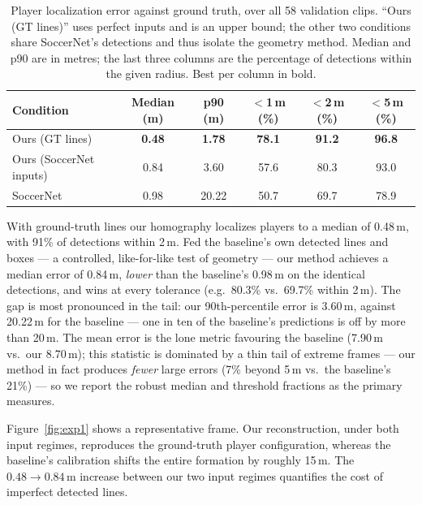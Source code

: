 \documentclass{article}
\begin{document}
\begin{table}[t]
  \caption{Player localization error against ground truth, over all 58
    validation clips. ``Ours (GT lines)'' uses perfect inputs and is an upper
    bound; the other two conditions share SoccerNet's detections and thus
    isolate the geometry method. Median and p90 are in metres; the last three
    columns are the percentage of detections within the given radius. Best
    per column in bold.}
  \label{tab:exp1}
  \centering
  \begin{tabular}{lccccc}
    \toprule
    Condition & Median (m) & p90 (m) & $<$1\,m (\%) & $<$2\,m (\%) & $<$5\,m (\%) \\
    \midrule
    Ours (GT lines)         & \textbf{0.48} & \textbf{1.78}  & \textbf{78.1} & \textbf{91.2} & \textbf{96.8} \\
    Ours (SoccerNet inputs) & 0.84          & 3.60           & 57.6          & 80.3          & 93.0 \\
    SoccerNet               & 0.98          & 20.22          & 50.7          & 69.7          & 78.9 \\
    \bottomrule
  \end{tabular}
\end{table}

With ground-truth lines our homography localizes players to a median of
0.48\,m, with 91\% of detections within 2\,m. Fed the baseline's own detected
lines and boxes --- a controlled, like-for-like test of geometry --- our
method achieves a median error of 0.84\,m, \emph{lower} than the baseline's
0.98\,m on the identical detections, and wins at every tolerance (e.g.\ 80.3\%
vs.\ 69.7\% within 2\,m). The gap is most pronounced in the tail: our
90th-percentile error is 3.60\,m, against 20.22\,m for the baseline --- one in
ten of the baseline's predictions is off by more than 20\,m. The mean error is
the lone metric favouring the baseline (7.90\,m vs.\ our 8.70\,m); this
statistic is dominated by a thin tail of extreme frames --- our method in fact
produces \emph{fewer} large errors (7\% beyond 5\,m vs.\ the baseline's 21\%)
--- so we report the robust median and threshold fractions as the primary
measures.

Figure~\ref{fig:exp1} shows a representative frame. Our reconstruction, under
both input regimes, reproduces the ground-truth player configuration, whereas
the baseline's calibration shifts the entire formation by roughly 15\,m. The
$0.48 \rightarrow 0.84$\,m increase between our two input regimes quantifies
the cost of imperfect detected lines.
\end{document}
